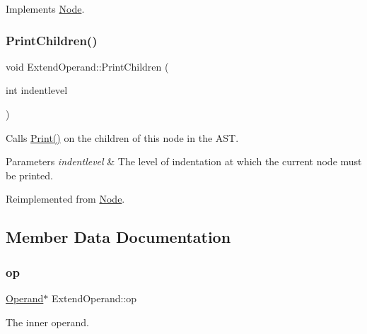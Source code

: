 Implements \hyperlink{class_node_a56e29657306ffb004d69c6929ae44269}{Node}.

\mbox{\label{class_extend_operand_afdf1598c150fdcf76f97b2e48f5c2a40}} 
\subsubsection{\texorpdfstring{Print\+Children()}{PrintChildren()}}
{\footnotesize\ttfamily void Extend\+Operand\+::\+Print\+Children (\begin{DoxyParamCaption}\item[{int}]{indentlevel }\end{DoxyParamCaption})\hspace{0.3cm}{\ttfamily [virtual]}}

Calls \hyperlink{class_node_a9ef727fd72d1a37792b3db60a8a479dd}{Print()} on the children of this node in the A\+ST. 
\begin{DoxyParams}{Parameters}
{\em indentlevel} & The level of indentation at which the current node must be printed. \\
\hline
\end{DoxyParams}


Reimplemented from \hyperlink{class_node_a3e67ec8d22182b721717af14fe0c3000}{Node}.



\subsection{Member Data Documentation}
\mbox{\label{class_extend_operand_a3070ccb0d6648ae1c98d54fa4134a483}} 
\subsubsection{\texorpdfstring{op}{op}}
{\footnotesize\ttfamily \hyperlink{class_operand}{Operand}$\ast$ Extend\+Operand\+::op\hspace{0.3cm}{\ttfamily [protected]}}

The inner operand. \mbox{\label{class_extend_operand_abe2019abb3a9e61cb5d9a7b962eb223d}} 
